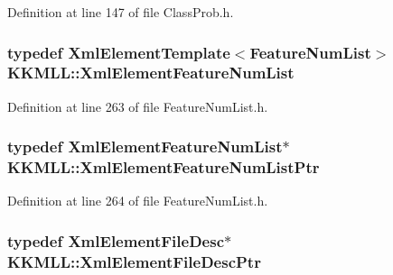 Definition at line 147 of file Class\+Prob.\+h.

\subsubsection[{\texorpdfstring{Xml\+Element\+Feature\+Num\+List}{XmlElementFeatureNumList}}]{\setlength{\rightskip}{0pt plus 5cm}typedef {\bf Xml\+Element\+Template}$<${\bf Feature\+Num\+List}$>$ {\bf K\+K\+M\+L\+L\+::\+Xml\+Element\+Feature\+Num\+List}}\hypertarget{namespace_k_k_m_l_l_aab39b3abe8386108dfce16438bfb5ecf}{}\label{namespace_k_k_m_l_l_aab39b3abe8386108dfce16438bfb5ecf}


Definition at line 263 of file Feature\+Num\+List.\+h.

\subsubsection[{\texorpdfstring{Xml\+Element\+Feature\+Num\+List\+Ptr}{XmlElementFeatureNumListPtr}}]{\setlength{\rightskip}{0pt plus 5cm}typedef {\bf Xml\+Element\+Feature\+Num\+List}$\ast$ {\bf K\+K\+M\+L\+L\+::\+Xml\+Element\+Feature\+Num\+List\+Ptr}}\hypertarget{namespace_k_k_m_l_l_ae82159171efc6f7ff8f7b74b512556ef}{}\label{namespace_k_k_m_l_l_ae82159171efc6f7ff8f7b74b512556ef}


Definition at line 264 of file Feature\+Num\+List.\+h.

\subsubsection[{\texorpdfstring{Xml\+Element\+File\+Desc\+Ptr}{XmlElementFileDescPtr}}]{\setlength{\rightskip}{0pt plus 5cm}typedef {\bf Xml\+Element\+File\+Desc}$\ast$ {\bf K\+K\+M\+L\+L\+::\+Xml\+Element\+File\+Desc\+Ptr}}\hypertarget{namespace_k_k_m_l_l_aae191e962cb28af7834276b68ee1d506}{}\label{namespace_k_k_m_l_l_aae191e962cb28af7834276b68ee1d506}


